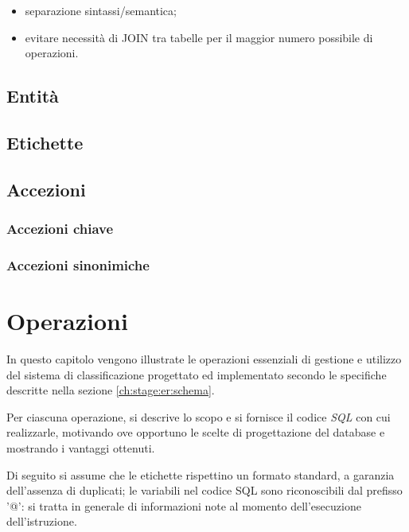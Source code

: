 \documentclass[10pt,a4paper,headinclude,footinclude,hidelinks]{scrreprt} %
\begin{document}
	\begin{itemize}
	\item separazione sintassi/semantica;
	\item evitare necessità di JOIN tra tabelle per il maggior numero possibile di operazioni.
	\end{itemize} 

	\section{Entit\`a}
	\section{Etichette}
	\section{Accezioni}
	\subsection{Accezioni chiave}
	\subsection{Accezioni sinonimiche}

	\chapter{Operazioni}
	\label{ch:stage:er:operazioni}
	In questo capitolo vengono illustrate le operazioni essenziali di gestione e utilizzo del sistema di classificazione progettato ed implementato secondo le specifiche descritte nella sezione \ref{ch:stage:er:schema}.

	Per ciascuna operazione, si descrive lo scopo e si fornisce il codice \textit{SQL} con cui realizzarle, motivando ove opportuno le scelte di progettazione del database e mostrando i vantaggi ottenuti.

	Di seguito si assume che le etichette rispettino un formato standard, a garanzia dell'assenza di duplicati; le variabili nel codice SQL sono riconoscibili dal prefisso '@': si tratta in generale di informazioni note al momento dell'esecuzione dell'istruzione.
\end{document}
